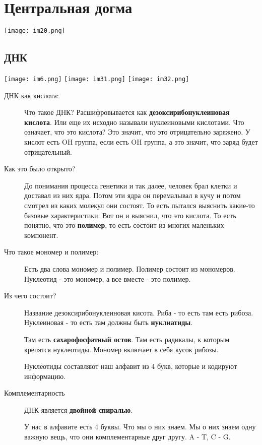 \section{Центральная догма}

\texttt{[image: im20.png]}

\subsection{ДНК}
\texttt{[image: im6.png]}
\texttt{[image: im31.png]}
\texttt{[image: im32.png]}

\begin{description}
\item[ДНК как кислота:]
Что такое ДНК? Расшифровывается как
\textbf{дезоксирибонуклеиновая кислота}. Или еще 
их исходно называли нуклеиновыми кислотами. Что означает, что 
это кислота? Это значит, что это отрицательно заряжено. У кислот есть 
OH группа, если есть OH группа, а это значит, что заряд будет отрицательный.

\item[Как это было открыто?] 
До понимания процесса генетики и так далее, человек брал клетки и доставал из
них ядра. Потом эти ядра он перемалывал в кучу и потом
смотрел из каких молекул они состоят. То есть пытался выяснить какие-то
базовые характеристики. Вот он и выяснил, что это кислота. То есть понятно,
что это \textbf{полимер}, то есть состоит из многих маленьких компонент.

\item[Что такое мономер и полимер:]
Есть два слова мономер и полимер. Полимер состоит из мономеров. 
Нуклеотид - это мономер, а все вместе - это полимер.

\item[Из чего состоит?]
Название дезоксирибонуклеиновая кисота. Риба - то есть там есть рибоза. 
Нуклеиновая - то есть там должны быть \textbf{нуклиатиды}. 

Там есть \textbf{сахарофосфатный остов}. Там есть радикалы, к которым крепятся 
нуклеотиды. Мономер включает в себя кусок рибозы. 

Нуклеотиды составляют наш алфавит из 4 букв, которые и кодируют информацию.

\item[Комплементарность]
ДНК является \textbf{двойной спиралью}. 

У нас в алфавите есть 4 буквы. Что мы о них знаем. Мы о них знаем одну важную вещь,
что они комплементарные друг другу. A - T, C - G.


\end{description}
